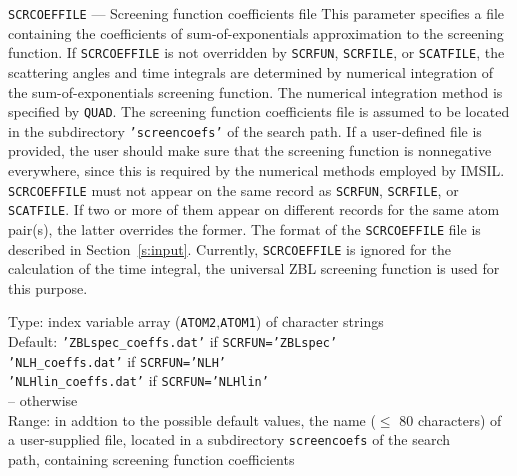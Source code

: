 \begin{keydescription}{\texttt{SCRCOEFFILE} --- Screening function coefficients file}
%
  This parameter specifies a file containing the coefficients of 
  sum-of-exponentials approximation to the screening function. 
  If \texttt{SCRCOEFFILE} is not overridden by \texttt{SCRFUN},
  \texttt{SCRFILE}, or \texttt{SCATFILE}, the scattering angles and time 
  integrals are determined by numerical integration of the 
  sum-of-exponentials screening function. The numerical integration 
  method is specified by \texttt{QUAD}. The screening function coefficients 
  file is assumed to be located in the subdirectory \texttt{'screencoefs'} 
  of the search path. If a user-defined file is provided, the user should make 
  sure that the screening function is nonnegative everywhere, since this is 
  required by the numerical methods employed by IMSIL. \texttt{SCRCOEFFILE} 
  must not appear on the same record as \texttt{SCRFUN}, \texttt{SCRFILE}, or 
  \texttt{SCATFILE}. If two or more of them appear on different records for the 
  same atom pair(s), the latter overrides the former. The format of the 
  \texttt{SCRCOEFFILE} file is described in Section~\ref{s:input}. Currently, 
  \texttt{SCRCOEFFILE} is ignored for the calculation of the time integral, the 
  universal ZBL screening function is used for this purpose.
  \begin{keytab}
    Type:    \> index variable array (\texttt{ATOM2},\texttt{ATOM1}) 
                of character strings \\ 
    Default: \> \texttt{'ZBLspec\_coeffs.dat'} if \texttt{SCRFUN='ZBLspec'} \\
             \> \texttt{'NLH\_coeffs.dat'} if \texttt{SCRFUN='NLH'} \\
             \> \texttt{'NLHlin\_coeffs.dat'} if \texttt{SCRFUN='NLHlin'} \\
             \> -- otherwise \\
    Range:   \> in addtion to the possible default values, 
                the name ($\le$ 80 characters) of \\
             \> a user-supplied file, located in a subdirectory
                \texttt{screencoefs} of the search \\
             \> path, containing  screening function coefficients 
  \end{keytab}
\end{keydescription}

